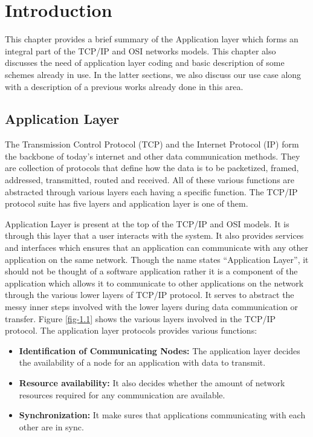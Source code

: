 \chapter{Introduction}
\label{chap-1}
\graphicspath{{Chapter_1/Vector/}{Chapter_1/}}

This chapter provides a brief summary of the Application layer which forms an integral part of the TCP/IP and OSI networks models. This chapter also discusses the need of application layer coding and basic description of some schemes already in use. In the latter sections, we also discuss our use case along with a description of a previous works already done in this area.

\section{Application Layer}

The Transmission Control Protocol (TCP) and the Internet Protocol (IP) form the backbone of today's internet and other data communication methods. They are collection of protocols that define how the data is to be packetized, framed, addressed, transmitted, routed and received. All of these various functions are abstracted through various layers each having a specific function. The TCP/IP protocol suite has five layers and application layer is one of them.

Application Layer is present at the top of the TCP/IP and OSI models. It is through this layer that a user interacts with the system. It also provides services and interfaces which ensures that an application can communicate with any other application on the same network. Though the name states ``Application Layer'', it should not be thought of a software application rather it is a component of the application which allows it to communicate to other applications on the network through the various lower layers of TCP/IP protocol. It serves to abstract the messy inner steps involved with the lower layers during data communication or transfer. Figure \ref{fig-1.1} shows the various layers involved in the TCP/IP protocol. The application layer protocols provides various functions:
\begin{itemize}
	\item \textbf{Identification of Communicating Nodes:} The application layer decides the availability of a node for an application with data to transmit.
	\item \textbf{Resource availability:} It also decides whether the amount of network resources required for any communication are available.
	\item \textbf{Synchronization:} It make sures that applications communicating with each other are in sync.
\end{itemize}


